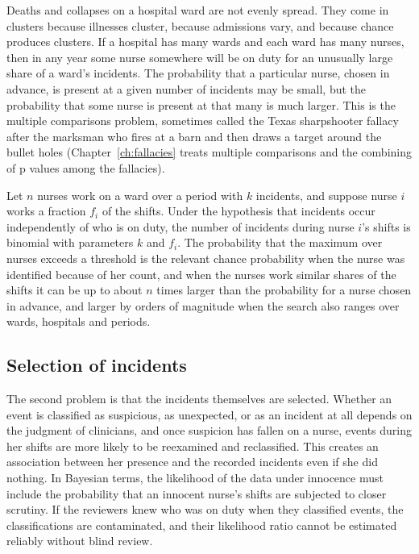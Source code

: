 Deaths and collapses on a hospital ward are not evenly spread. They come in clusters because illnesses cluster, because admissions vary, and because chance produces clusters. If a hospital has many wards and each ward has many nurses, then in any year some nurse somewhere will be on duty for an unusually large share of a ward's incidents. The probability that a particular nurse, chosen in advance, is present at a given number of incidents may be small, but the probability that some nurse is present at that many is much larger. This is the multiple comparisons problem, sometimes called the Texas sharpshooter fallacy after the marksman who fires at a barn and then draws a target around the bullet holes (Chapter~\ref{ch:fallacies} treats multiple comparisons and the combining of p values among the fallacies).

Let $n$ nurses work on a ward over a period with $k$ incidents, and suppose nurse $i$ works a fraction $f_i$ of the shifts. Under the hypothesis that incidents occur independently of who is on duty, the number of incidents during nurse $i$'s shifts is binomial with parameters $k$ and $f_i$. The probability that the maximum over nurses exceeds a threshold is the relevant chance probability when the nurse was identified because of her count, and when the nurses work similar shares of the shifts it can be up to about $n$ times larger than the probability for a nurse chosen in advance, and larger by orders of magnitude when the search also ranges over wards, hospitals and periods.

\subsection{Selection of incidents}

The second problem is that the incidents themselves are selected. Whether an event is classified as suspicious, as unexpected, or as an incident at all depends on the judgment of clinicians, and once suspicion has fallen on a nurse, events during her shifts are more likely to be reexamined and reclassified. This creates an association between her presence and the recorded incidents even if she did nothing. In Bayesian terms, the likelihood of the data under innocence must include the probability that an innocent nurse's shifts are subjected to closer scrutiny. If the reviewers knew who was on duty when they classified events, the classifications are contaminated, and their likelihood ratio cannot be estimated reliably without blind review.

